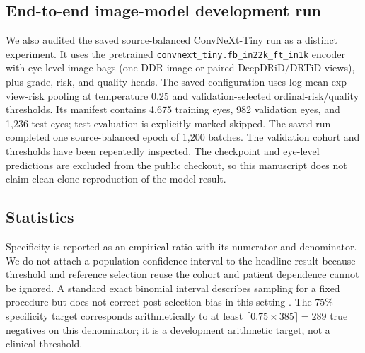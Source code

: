 \documentclass[11pt]{article}
\begin{document}
\subsection{End-to-end image-model development run}
We also audited the saved source-balanced ConvNeXt-Tiny run as a distinct experiment. It uses the pretrained \texttt{convnext\_tiny.fb\_in22k\_ft\_in1k} encoder with eye-level image bags (one DDR image or paired DeepDRiD/DRTiD views), plus grade, risk, and quality heads. The saved configuration uses log-mean-exp view-risk pooling at temperature 0.25 and validation-selected ordinal-risk/quality thresholds. Its manifest contains 4,675 training eyes, 982 validation eyes, and 1,236 test eyes; test evaluation is explicitly marked skipped. The saved run completed one source-balanced epoch of 1,200 batches. The validation cohort and thresholds have been repeatedly inspected. The checkpoint and eye-level predictions are excluded from the public checkout, so this manuscript does not claim clean-clone reproduction of the model result.

\subsection{Statistics}
Specificity is reported as an empirical ratio with its numerator and denominator. We do not attach a population confidence interval to the headline result because threshold and reference selection reuse the cohort and patient dependence cannot be ignored. A standard exact binomial interval describes sampling for a fixed procedure but does not correct post-selection bias in this setting \cite{clopperpearson,cawley2010}. The 75\% specificity target corresponds arithmetically to at least $\lceil0.75\times385\rceil=289$ true negatives on this denominator; it is a development arithmetic target, not a clinical threshold.
\end{document}
